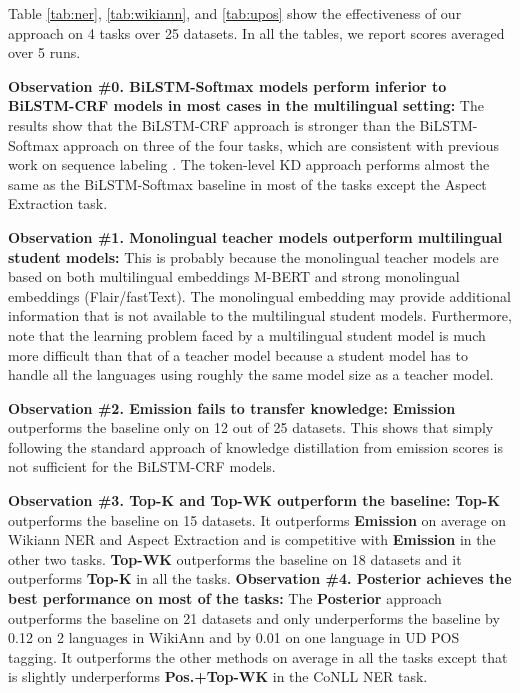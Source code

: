 \documentclass[11pt,a4paper]{article}
\begin{document}
Table \ref{tab:ner}, \ref{tab:wikiann}, and \ref{tab:upos} show the effectiveness of our approach on 4 tasks over 25 datasets. In all the tables, we report scores averaged over 5 runs. 

\noindent\textbf{Observation \#0. BiLSTM-Softmax models perform inferior to BiLSTM-CRF models in most cases in the multilingual setting:}
The results show that the BiLSTM-CRF approach is stronger than the BiLSTM-Softmax approach on three of the four tasks, which are consistent with previous work on sequence labeling \cite{ma-hovy-2016-end,reimers2017optimal,yang-etal-2018-design}. The token-level KD approach performs almost the same as the BiLSTM-Softmax baseline in most of the tasks except the Aspect Extraction task.

\noindent\textbf{Observation \#1. Monolingual teacher models outperform multilingual student models:}
This is probably because the monolingual teacher models are based on both multilingual embeddings M-BERT and strong monolingual embeddings (Flair/fastText). The monolingual embedding may provide additional information that is not available to the multilingual student models.
Furthermore, note that the learning problem faced by a multilingual student model is much more difficult than that of a teacher model because a student model has to handle all the languages using roughly the same model size as a teacher model.


\noindent\textbf{Observation \#2. Emission fails to transfer knowledge:}
\textbf{Emission} outperforms the baseline only on 12 out of 25 datasets. This shows that simply following the standard approach of knowledge distillation from emission scores is not sufficient for the BiLSTM-CRF models.

\noindent\textbf{Observation \#3. Top-K and Top-WK outperform the baseline:}
\textbf{Top-K} outperforms the baseline on 15 datasets. It outperforms \textbf{Emission} on average on Wikiann NER and Aspect Extraction and is competitive with \textbf{Emission} in the other two tasks. \textbf{Top-WK} outperforms the baseline on 18 datasets and it outperforms \textbf{Top-K} in all the tasks.
\noindent\textbf{Observation \#4. Posterior achieves the best performance on most of the tasks:}
The \textbf{Posterior} approach outperforms the baseline on 21 datasets and only underperforms the baseline by 0.12 on 2 languages in WikiAnn and by 0.01 on one language in UD POS tagging. It outperforms the other methods on average in all the tasks except that is slightly underperforms \textbf{Pos.+Top-WK} in the CoNLL NER task.
\end{document}
